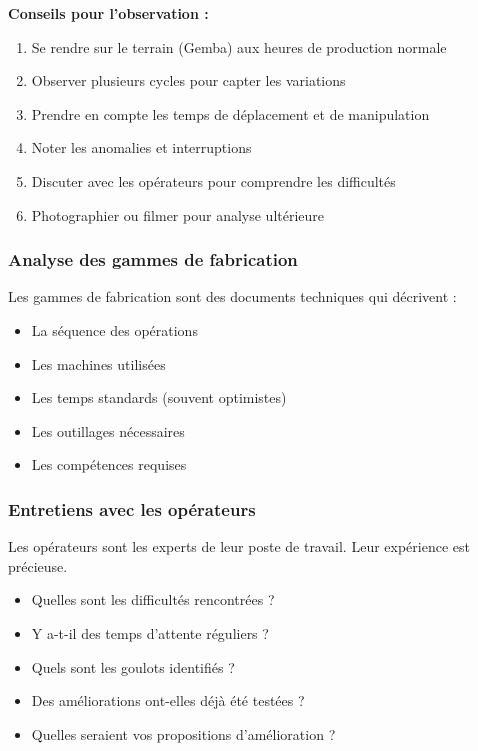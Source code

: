 \documentclass[12pt,a4paper]{article}
\newenvironment{methodbox}[1]
  {\begin{tcolorbox}[colback=blue!5!white, colframe=methodcolor, title=#1]\small}
  {\end{tcolorbox}}
\newenvironment{conseil}
  {\begin{tcolorbox}[colback=green!5!white, colframe=green!50!black, title=\textbf{Conseil}]\small}
  {\end{tcolorbox}}
\begin{document}
\begin{conseil}
\noindent\textbf{Conseils pour l'observation :}
\begin{enumerate}
    \item Se rendre sur le terrain (Gemba) aux heures de production normale
    \item Observer plusieurs cycles pour capter les variations
    \item Prendre en compte les temps de déplacement et de manipulation
    \item Noter les anomalies et interruptions
    \item Discuter avec les opérateurs pour comprendre les difficultés
    \item Photographier ou filmer pour analyse ultérieure
\end{enumerate}
\end{conseil}

\subsubsection{Analyse des gammes de fabrication}

Les gammes de fabrication sont des documents techniques qui décrivent :
\begin{itemize}
    \item La séquence des opérations
    \item Les machines utilisées
    \item Les temps standards (souvent optimistes)
    \item Les outillages nécessaires
    \item Les compétences requises
\end{itemize}

\subsubsection{Entretiens avec les opérateurs}

Les opérateurs sont les experts de leur poste de travail. Leur expérience est précieuse.

\begin{methodbox}{Questions à poser aux opérateurs}
\begin{itemize}
    \item Quelles sont les difficultés rencontrées ?
    \item Y a-t-il des temps d'attente réguliers ?
    \item Quels sont les goulots identifiés ?
    \item Des améliorations ont-elles déjà été testées ?
    \item Quelles seraient vos propositions d'amélioration ?
\end{itemize}
\end{methodbox}
\end{document}
